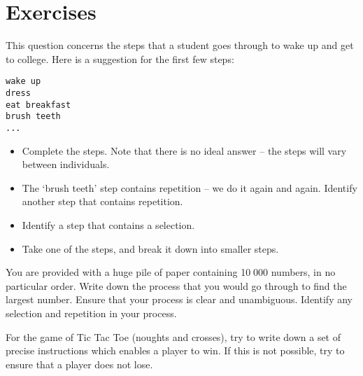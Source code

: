 	\section{Exercises}
		\begin{enumChapter}
		\item	This question concerns the steps that a student goes through to wake up and get to college. Here is a suggestion for the first few steps:
			\begin{lstlisting}
wake up
dress
eat breakfast
brush teeth
...
			\end{lstlisting}
			\begin{itemize}
				\item	Complete the steps. Note that there is no ideal answer – the steps will vary between individuals.
				\item	The ‘brush teeth’ step contains repetition – we do it again and again. Identify another step that contains repetition.
				\item	Identify a step that contains a selection.
				\item	Take one of the steps, and break it down into smaller steps.
			\end{itemize}
		\item	You are provided with a huge pile of paper containing 10 000 numbers, in no particular order. Write down the process that you would go through to find the largest number. Ensure that your process is clear and unambiguous. Identify any selection and repetition in your process.
		\item	For the game of Tic Tac Toe (noughts and crosses), try to write down a set of precise instructions which enables a player to win. If this is not possible, try to ensure that a player does not lose.
	\end{enumChapter}

